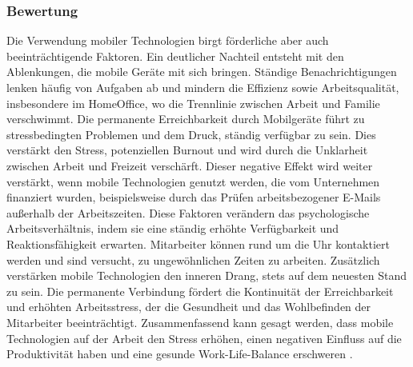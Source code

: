 \documentclass[12pt,a4paper]{article}
\begin{document}
\subsubsection*{Bewertung}
Die Verwendung mobiler Technologien birgt förderliche aber auch beeinträchtigende Faktoren. Ein deutlicher Nachteil entsteht mit den Ablenkungen, die mobile Geräte mit sich bringen. Ständige Benachrichtigungen lenken häufig von Aufgaben ab und mindern die Effizienz sowie Arbeitsqualität, insbesondere im HomeOffice, wo die Trennlinie zwischen Arbeit und Familie verschwimmt. Die permanente Erreichbarkeit durch Mobilgeräte führt zu stressbedingten Problemen und dem Druck, ständig verfügbar zu sein. Dies verstärkt den Stress, potenziellen Burnout und wird durch die Unklarheit zwischen Arbeit und Freizeit verschärft. Dieser negative Effekt wird weiter verstärkt, wenn mobile Technologien genutzt werden, die vom Unternehmen finanziert wurden, beispielsweise durch das Prüfen arbeitsbezogener E-Mails außerhalb der Arbeitszeiten. Diese Faktoren verändern das psychologische Arbeitsverhältnis, indem sie eine ständig erhöhte Verfügbarkeit und Reaktionsfähigkeit erwarten. Mitarbeiter können rund um die Uhr kontaktiert werden und sind versucht, zu ungewöhnlichen Zeiten zu arbeiten. Zusätzlich verstärken mobile Technologien den inneren Drang, stets auf dem neuesten Stand zu sein. Die permanente Verbindung fördert die Kontinuität der Erreichbarkeit und erhöhten Arbeitsstress, der die Gesundheit und das Wohlbefinden der Mitarbeiter beeinträchtigt. Zusammenfassend kann gesagt werden, dass mobile Technologien auf der Arbeit den Stress erhöhen, einen negativen Einfluss auf die Produktivität haben und eine gesunde Work-Life-Balance erschweren \parencite[vgl.][]{sarker2012managing}. 
\end{document}
